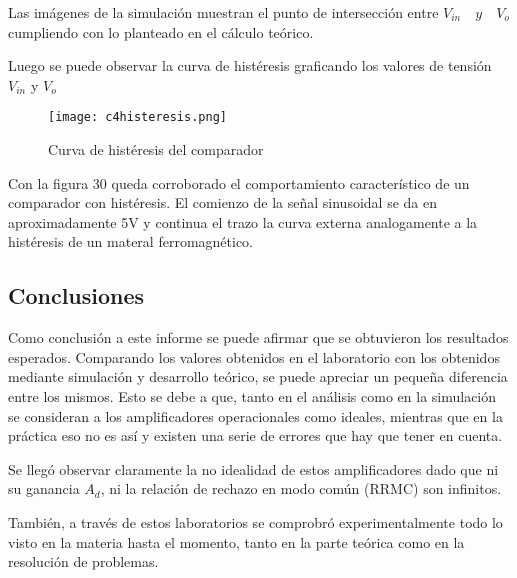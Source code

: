 Las imágenes de la simulación muestran el punto de intersección entre $V_{in} \quad y \quad V_o$ cumpliendo con lo planteado en el cálculo teórico.

Luego se puede observar la curva de histéresis graficando los valores de tensión $V_{in}$ y $V_o$


\vspace{1em}

\begin{figure}[h!]
     \centering
     \texttt{[image: c4histeresis.png]}
     \caption{Curva de histéresis del comparador}
     \label{fig:simulacionC4}
\end{figure}

\vspace{1em}

Con la figura 30 queda corroborado el comportamiento característico de un comparador con histéresis. El comienzo de la señal sinusoidal se da en aproximadamente 5V y continua el trazo la curva externa 
analogamente a la histéresis de un materal ferromagnético.

\newpage

\subsection{Conclusiones}
Como conclusión a este informe se puede afirmar que se obtuvieron los resultados esperados. Comparando los valores obtenidos en el laboratorio con los obtenidos
mediante simulación y desarrollo teórico, se puede apreciar un pequeña diferencia entre los mismos. Esto se debe a que, tanto en el análisis como en la simulación se
consideran a los amplificadores operacionales como ideales, mientras que en la práctica eso no es así y existen una serie de errores que hay que tener en cuenta.

Se llegó observar claramente la no idealidad de estos amplificadores dado que ni su ganancia $A_d$, ni la relación de rechazo en modo común (RRMC) son infinitos.

También, a través de estos laboratorios se comprobró experimentalmente todo lo visto en la materia hasta el momento, tanto en la parte teórica como en la
resolución de problemas.

%